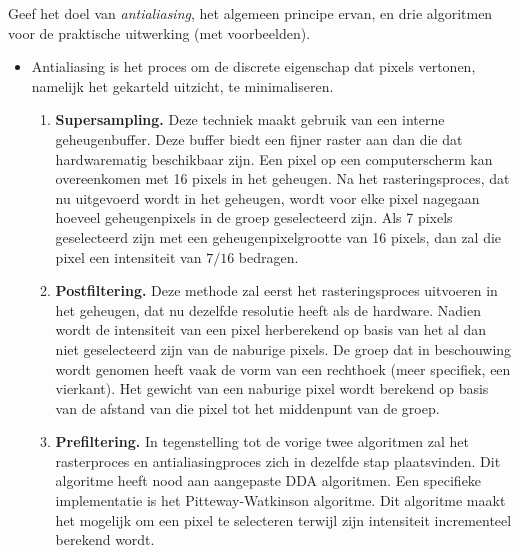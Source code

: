 \documentclass{report}
\begin{document}
\begin{enumerate}
		\vraag
		{
			Geef het doel van \textit{antialiasing}, het algemeen principe ervan, en drie algoritmen voor de praktische uitwerking (met voorbeelden). 
		}
		{
			\begin{itemize}
				\item Antialiasing is het proces om de discrete eigenschap dat pixels vertonen, namelijk het gekarteld uitzicht, te minimaliseren. 
				\begin{enumerate}
					\item \textbf{Supersampling.} Deze techniek maakt gebruik van een interne geheugenbuffer. Deze buffer biedt een fijner raster aan dan die dat hardwarematig beschikbaar zijn. Een pixel op een computerscherm kan overeenkomen met 16 pixels in het geheugen. Na het rasteringsproces, dat nu uitgevoerd wordt in het geheugen, wordt voor elke pixel nagegaan hoeveel geheugenpixels in de groep geselecteerd zijn. Als 7 pixels geselecteerd zijn met een geheugenpixelgrootte van 16 pixels, dan zal die pixel een intensiteit van $7/16$ bedragen.
					\item \textbf{Postfiltering.} Deze methode zal eerst het rasteringsproces uitvoeren in het geheugen, dat nu dezelfde resolutie heeft als de hardware. Nadien wordt de intensiteit van een pixel herberekend op basis van het al dan niet geselecteerd zijn van de naburige pixels. De groep dat in beschouwing wordt genomen heeft vaak de vorm van een rechthoek (meer specifiek, een vierkant). Het gewicht van een naburige pixel wordt berekend op basis van de afstand van die pixel tot het middenpunt van de groep.
					\item \textbf{Prefiltering.} In tegenstelling tot de vorige twee algoritmen zal het rasterproces en antialiasingproces zich in dezelfde stap plaatsvinden. Dit algoritme heeft nood aan aangepaste DDA algoritmen. Een specifieke implementatie is het Pitteway-Watkinson algoritme. Dit algoritme maakt het mogelijk om een pixel te selecteren terwijl zijn intensiteit incrementeel berekend wordt. 
				\end{enumerate}
			\end{itemize}
		}
	\end{enumerate}
\end{document}
